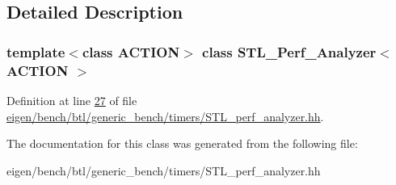 \subsection{Detailed Description}
\subsubsection*{template$<$class A\+C\+T\+I\+ON$>$\newline
class S\+T\+L\+\_\+\+Perf\+\_\+\+Analyzer$<$ A\+C\+T\+I\+O\+N $>$}



Definition at line \hyperlink{eigen_2bench_2btl_2generic__bench_2timers_2_s_t_l__perf__analyzer_8hh_source_l00027}{27} of file \hyperlink{eigen_2bench_2btl_2generic__bench_2timers_2_s_t_l__perf__analyzer_8hh_source}{eigen/bench/btl/generic\+\_\+bench/timers/\+S\+T\+L\+\_\+perf\+\_\+analyzer.\+hh}.



The documentation for this class was generated from the following file\+:\begin{DoxyCompactItemize}
\item 
eigen/bench/btl/generic\+\_\+bench/timers/\+S\+T\+L\+\_\+perf\+\_\+analyzer.\+hh\end{DoxyCompactItemize}
